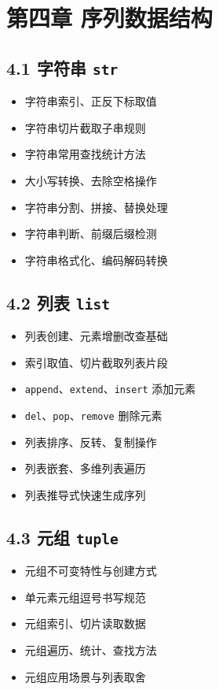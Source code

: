 \section{第四章 序列数据结构}
\subsection{4.1 字符串 \texttt{str}}
\begin{itemize}
\item 字符串索引、正反下标取值
\item 字符串切片截取子串规则
\item 字符串常用查找统计方法
\item 大小写转换、去除空格操作
\item 字符串分割、拼接、替换处理
\item 字符串判断、前缀后缀检测
\item 字符串格式化、编码解码转换
\end{itemize}

\subsection{4.2 列表 \texttt{list}}
\begin{itemize}
\item 列表创建、元素增删改查基础
\item 索引取值、切片截取列表片段
\item \texttt{append}、\texttt{extend}、\texttt{insert} 添加元素
\item \texttt{del}、\texttt{pop}、\texttt{remove} 删除元素
\item 列表排序、反转、复制操作
\item 列表嵌套、多维列表遍历
\item 列表推导式快速生成序列
\end{itemize}

\subsection{4.3 元组 \texttt{tuple}}
\begin{itemize}
\item 元组不可变特性与创建方式
\item 单元素元组逗号书写规范
\item 元组索引、切片读取数据
\item 元组遍历、统计、查找方法
\item 元组应用场景与列表取舍
\end{itemize}

